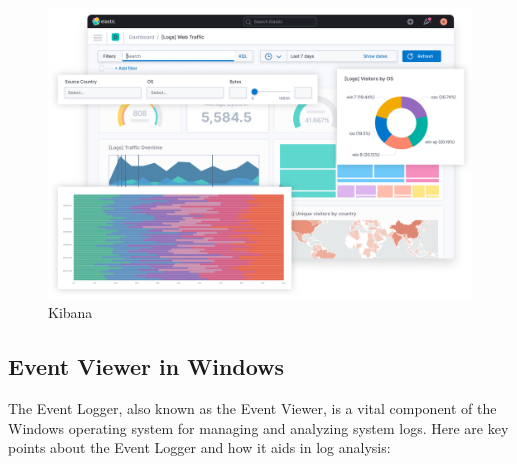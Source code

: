 \documentclass[11pt]{article}
\begin{document}
\begin{figure}[H]
    \centering
    \includegraphics[width=.45\textwidth]{kibana/kibana_6.jpg}
    \caption{Kibana}
\end{figure}

\subsection{Event Viewer in Windows}

The Event Logger, also known as the Event Viewer, is a vital component of the Windows operating system for managing and analyzing system logs. Here are key points about the Event Logger and how it aids in log analysis:
\end{document}
